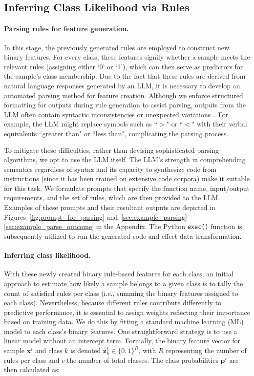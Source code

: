 \subsection{Inferring Class Likelihood via Rules}
\label{Sec:training}

\paragraph{Parsing rules for feature generation.} In this stage, the previously generated rules are employed to construct new binary features. For every class, these features signify whether a sample meets the relevant rules (assigning either ‘0’ or ‘1’), which can then serve as predictors for the sample’s class membership. Due to the fact that these rules are derived from natural language responses generated by an LLM, it is necessary to develop an automated parsing method for feature creation. Although we enforce structured formatting for outputs during rule generation to assist parsing, outputs from the LLM often contain syntactic inconsistencies or unexpected variations~\cite{kovavc2023large}. For example, the LLM might replace symbols such as ``$>$" or ``$<$" with their verbal equivalents ``greater than" or ``less than", complicating the parsing process.

To mitigate these difficulties, rather than devising sophisticated parsing algorithms, we opt to use the LLM itself. The LLM’s strength in comprehending semantics regardless of syntax and its capacity to synthesize code from instructions (since it has been trained on extensive code corpora) make it suitable for this task. We formulate prompts that specify the function name, input/output requirements, and the set of rules, which are then provided to the LLM. Examples of these prompts and their resultant outputs are depicted in Figures~\ref{fig:prompt_for_parsing} and~\ref{sec:example_parsing}-\ref{sec:example_parse_outcome} in the Appendix. The Python \texttt{exec()} function is subsequently utilized to run the generated code and effect data transformation.

\vspace*{-0.12in}
\paragraph{Inferring class likelihood.} With these newly created binary rule-based features for each class, an initial approach to estimate how likely a sample belongs to a given class is to tally the count of satisfied rules per class (i.e., summing the binary features assigned to each class). Nevertheless, because different rules contribute differently to predictive performance, it is essential to assign weights reflecting their importance based on training data. We do this by fitting a standard machine learning (ML) model to each class's binary features. One straightforward strategy is to use a linear model without an intercept term. Formally, the binary feature vector for sample $\mathbf{x}^i$ and class $k$ is denoted $\mathbf{z}_k^i \in \{0, 1\}^R$, with $R$ representing the number of rules per class and $c$ the number of total classes. The class probabilities $\mathbf{p}^i$ are then calculated as:

